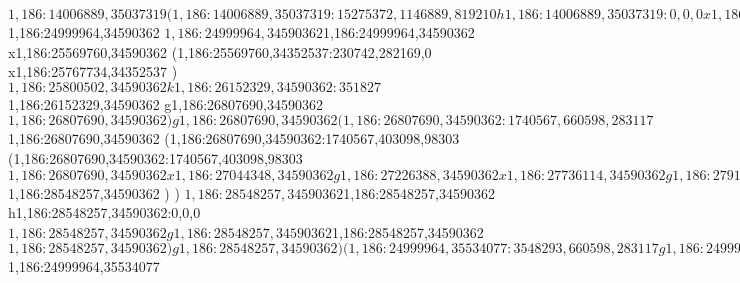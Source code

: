 {$1,186:14006889,35037319
(1,186:14006889,35037319:15275372,1146889,819210
h1,186:14006889,35037319:0,0,0
x1,186:14293382,35037319
(1,186:14293382,35135622:343610,318577,0
x1,186:14604224,35135622
)
g1,186:14819032,35037319
x1,186:15510803,35037319
g1,186:15692843,35037319
[1,186:15692843,35037319:1092270,437688,0
(1,186:15692843,35037319:1092270,437688,0
x1,186:16785113,35037319
)
]
x1,186:17349452,35037319
g1,186:17531492,35037319
x1,186:17713537,35037319
g1,186:17895577,35037319
x1,186:18465373,35037319
(1,186:18465373,34766726:230742,282169,0
x1,186:18663347,34766726
)
g1,186:18878155,35037319
x1,186:19315063,35037319
g1,186:19497103,35037319
x1,186:19994199,35037319
(1,186:19994199,35135622:455113,313481,0
x1,186:20303676,35135622
)
x1,186:21851059,35037319
g1,186:22506420,35037319
g1,186:22615644,35037319
[1,186:22615644,35037319:800538,605170,0
(1,186:22736702,34869837:0,437688,0
x1,186:23064383,34869837
)
(1,186:22615644,35037319:800538,552762,0
x1,186:23185440,35037319
(1,186:23185440,34766726:230742,282169,0
x1,186:23383414,34766726
)
)
]
g1,186:23598222,35037319
x1,186:24289993,35037319
g1,186:24472033,35037319
(1,186:24472033,35037319:4154867,1146889,819210
(1,186:24472033,33916643:527931,26213,1939886
x1,186:24999964,33916643
)
[1,186:24999964,35037319:3548293,1107555,779875
(1,186:24999964,34590362:3548293,660598,283117
g1,186:24999964,34590362
(1,186:24999964,34590362:1807726,660598,283117
r1,186:24999964,34590362:0,943715,283117
$1,186:24999964,34590362
$1,186:24999964,34590362
$1,186:24999964,34590362
x1,186:25569760,34590362
(1,186:25569760,34352537:230742,282169,0
x1,186:25767734,34352537
)
$1,186:25800502,34590362
k1,186:26152329,34590362:351827
$1,186:26152329,34590362
g1,186:26807690,34590362
$1,186:26807690,34590362
)
g1,186:26807690,34590362
(1,186:26807690,34590362:1740567,660598,283117
$1,186:26807690,34590362
(1,186:26807690,34590362:1740567,403098,98303
(1,186:26807690,34590362:1740567,403098,98303
$1,186:26807690,34590362
x1,186:27044348,34590362
g1,186:27226388,34590362
x1,186:27736114,34590362
g1,186:27918154,34590362
x1,186:28204647,34590362
(1,186:28204647,34688665:343610,318577,0
x1,186:28515489,34688665
)
$1,186:28548257,34590362
)
)
$1,186:28548257,34590362
$1,186:28548257,34590362
h1,186:28548257,34590362:0,0,0
$1,186:28548257,34590362
g1,186:28548257,34590362
$1,186:28548257,34590362
$1,186:28548257,34590362
)
g1,186:28548257,34590362
)
(1,186:24999964,35534077:3548293,660598,283117
g1,186:24999964,35534077
(1,186:24999964,35534077:1807726,660598,283117
r1,186:24999964,35534077:0,943715,283117
$1,186:24999964,35534077
}
